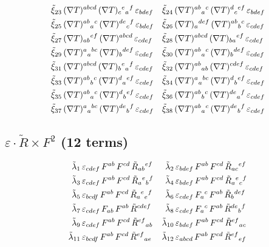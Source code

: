 \documentclass[12pt,a4paper]{article}
\newcommand{\Rt}{\tilde{R}}         %
\newcommand{\del}{\nabla}            %
\newcommand{\eps}{\varepsilon}       %
\begin{document}
{\begin{align}
  \tilde{\xi}_{23}&\, (\del T)^{abcd}\,(\del T)_{c}{}^{e}{}_{a}{}^{f}\,\eps_{bdef}  &
  \tilde{\xi}_{24}&\, (\del T)^{ab}{}_{a}{}^{c}\,(\del T)^{d}{}_{c}{}^{ef}\,\eps_{bdef}  \notag\\
  \tilde{\xi}_{25}&\, (\del T)^{ab}{}_{a}{}^{c}\,(\del T)^{de}{}_{c}{}^{f}\,\eps_{bdef}  &
  \tilde{\xi}_{26}&\, (\del T)_{a}{}^{def}\,(\del T)^{ab}{}_{b}{}^{c}\,\eps_{cdef}  \notag\\
  \tilde{\xi}_{27}&\, (\del T)_{ab}{}^{ef}\,(\del T)^{abcd}\,\eps_{cdef}  &
  \tilde{\xi}_{28}&\, (\del T)^{abcd}\,(\del T)_{ba}{}^{ef}\,\eps_{cdef}  \notag\\
  \tilde{\xi}_{29}&\, (\del T)^{a}{}_{a}{}^{bc}\,(\del T)_{b}{}^{def}\,\eps_{cdef}  &
  \tilde{\xi}_{30}&\, (\del T)^{ab}{}_{a}{}^{c}\,(\del T)_{b}{}^{def}\,\eps_{cdef}  \notag\\
  \tilde{\xi}_{31}&\, (\del T)^{abcd}\,(\del T)_{b}{}^{e}{}_{a}{}^{f}\,\eps_{cdef}  &
  \tilde{\xi}_{32}&\, (\del T)^{ab}{}_{ab}\,(\del T)^{cdef}\,\eps_{cdef}  \notag\\
  \tilde{\xi}_{33}&\, (\del T)^{ab}{}_{b}{}^{c}\,(\del T)^{d}{}_{a}{}^{ef}\,\eps_{cdef}  &
  \tilde{\xi}_{34}&\, (\del T)^{a}{}_{a}{}^{bc}\,(\del T)^{d}{}_{b}{}^{ef}\,\eps_{cdef}  \notag\\
  \tilde{\xi}_{35}&\, (\del T)^{ab}{}_{a}{}^{c}\,(\del T)^{d}{}_{b}{}^{ef}\,\eps_{cdef}  &
  \tilde{\xi}_{36}&\, (\del T)^{ab}{}_{b}{}^{c}\,(\del T)^{de}{}_{a}{}^{f}\,\eps_{cdef}  \notag\\
  \tilde{\xi}_{37}&\, (\del T)^{a}{}_{a}{}^{bc}\,(\del T)^{de}{}_{b}{}^{f}\,\eps_{cdef}  &
  \tilde{\xi}_{38}&\, (\del T)^{ab}{}_{a}{}^{c}\,(\del T)^{de}{}_{b}{}^{f}\,\eps_{cdef}
  \label{eq:eps_dt_dt_explicit}
\end{align}
}

\subsection{$\eps \cdot \Rt \times F^2$ (12 terms)}
\begin{align}
  \tilde{\lambda}_1&\, \eps_{cdef}\,F^{ab}\,F^{cd}\,\Rt_{ab}{}^{ef}  &
  \tilde{\lambda}_2&\, \eps_{bdef}\,F^{ab}\,F^{cd}\,\Rt_{ac}{}^{ef}  \notag\\
  \tilde{\lambda}_3&\, \eps_{cdef}\,F^{ab}\,F^{cd}\,\Rt_{a}{}^{e}{}_{b}{}^{f}  &
  \tilde{\lambda}_4&\, \eps_{bdef}\,F^{ab}\,F^{cd}\,\Rt_{a}{}^{e}{}_{c}{}^{f}  \notag\\
  \tilde{\lambda}_5&\, \eps_{bcdf}\,F^{ab}\,F^{cd}\,\Rt_{a}{}^{e}{}_{e}{}^{f}  &
  \tilde{\lambda}_6&\, \eps_{cdef}\,F_{a}{}^{c}\,F^{ab}\,\Rt_{b}{}^{def}  \notag\\
  \tilde{\lambda}_7&\, \eps_{cdef}\,F_{ab}\,F^{ab}\,\Rt^{cdef}  &
  \tilde{\lambda}_8&\, \eps_{cdef}\,F_{a}{}^{c}\,F^{ab}\,\Rt^{de}{}_{b}{}^{f}  \notag\\
  \tilde{\lambda}_9&\, \eps_{cdef}\,F^{ab}\,F^{cd}\,\Rt^{ef}{}_{ab}  &
  \tilde{\lambda}_{10}&\, \eps_{bdef}\,F^{ab}\,F^{cd}\,\Rt^{ef}{}_{ac}  \notag\\
  \tilde{\lambda}_{11}&\, \eps_{bcdf}\,F^{ab}\,F^{cd}\,\Rt^{ef}{}_{ae}  &
  \tilde{\lambda}_{12}&\, \eps_{abcd}\,F^{ab}\,F^{cd}\,\Rt^{ef}{}_{ef}
  \label{eq:eps_rff_explicit}
\end{align}
\end{document}
